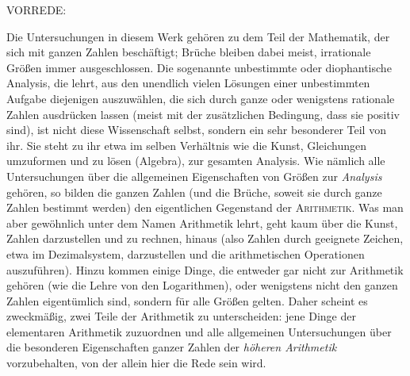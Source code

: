 \begin{center}
{\Large\textsc{VORREDE:}}

\medskip
{}
\end{center}

Die Untersuchungen in diesem Werk gehören zu dem Teil der Mathematik, der sich mit ganzen Zahlen beschäftigt; Brüche bleiben dabei meist, irrationale Größen immer ausgeschlossen. Die sogenannte unbestimmte oder diophantische Analysis, die lehrt, aus den unendlich vielen Lösungen einer unbestimmten Aufgabe diejenigen auszuwählen, die sich durch ganze oder wenigstens rationale Zahlen ausdrücken lassen (meist mit der zusätzlichen Bedingung, dass sie positiv sind), ist nicht diese Wissenschaft selbst, sondern ein sehr besonderer Teil von ihr. Sie steht zu ihr etwa im selben Verhältnis wie die Kunst, Gleichungen umzuformen und zu lösen (Algebra), zur gesamten Analysis. Wie nämlich alle Untersuchungen über die allgemeinen Eigenschaften von Größen zur \emph{Analysis} gehören, so bilden die ganzen Zahlen (und die Brüche, soweit sie durch ganze Zahlen bestimmt werden) den eigentlichen Gegenstand der \textsc{Arithmetik}. Was man aber gewöhnlich unter dem Namen Arithmetik lehrt, geht kaum über die Kunst, Zahlen darzustellen und zu rechnen, hinaus (also Zahlen durch geeignete Zeichen, etwa im Dezimalsystem, darzustellen und die arithmetischen Operationen auszuführen). Hinzu kommen einige Dinge, die entweder gar nicht zur Arithmetik gehören (wie die Lehre von den Logarithmen), oder wenigstens nicht den ganzen Zahlen eigentümlich sind, sondern für alle Größen gelten. Daher scheint es zweckmäßig, zwei Teile der Arithmetik zu unterscheiden: jene Dinge der elementaren Arithmetik zuzuordnen und alle allgemeinen Untersuchungen über die besonderen Eigenschaften ganzer Zahlen der \emph{höheren Arithmetik} vorzubehalten, von der allein hier die Rede sein wird.

